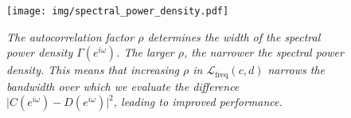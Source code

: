 \begin{figure}[h]
    \centering
    \texttt{[image: img/spectral\_power\_density.pdf]}
    \caption{\textit{The autocorrelation factor $\rho$ determines the width of the spectral power density $\Gamma(e^{i\omega})$. The larger $\rho$, the narrower the spectral power density. This means that increasing $\rho$ in $\mathcal{L}_\text{freq}(c, d)$ narrows the bandwidth over which we evaluate the difference $\vert C(e^{i\omega}) - D(e^{i\omega})\vert^2$, leading to improved performance.}}
    \label{figure spectral power density}
\end{figure}
